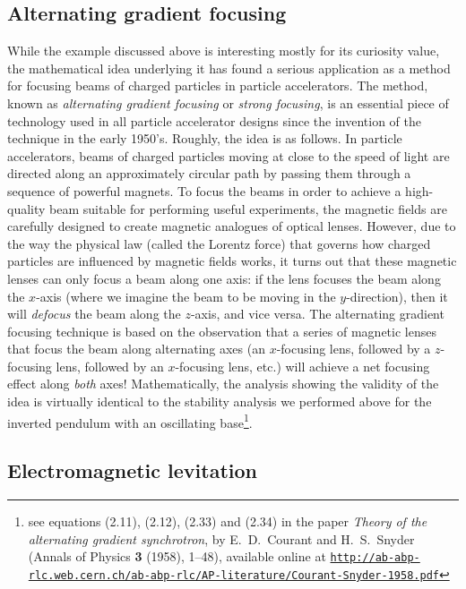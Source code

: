 \documentclass[12pt]{amsart}
\newcounter{example}
\begin{document}
\subsection{Alternating gradient focusing}

While the example discussed above is interesting mostly for its curiosity value, the mathematical idea underlying it has found a serious application as a method for focusing beams of charged particles in particle accelerators. The method, known as \emph{alternating gradient focusing} or \emph{strong focusing}, is an essential piece of technology used in all particle accelerator designs since the invention of the technique in the early 1950's. Roughly, the idea is as follows. In particle accelerators, beams of charged particles moving at close to the speed of light are directed along an approximately circular path by passing them through a sequence of powerful magnets. To focus the beams in order to achieve a high-quality beam suitable for performing useful experiments, the magnetic fields are carefully designed to create magnetic analogues of optical lenses. However, due to the way the physical law (called the Lorentz force) that governs how charged particles are influenced by magnetic fields works, it turns out that these magnetic lenses can only focus a beam along one axis: if the lens focuses the beam along the $x$-axis (where we imagine the beam to be moving in the $y$-direction), then it will \emph{defocus} the beam along the $z$-axis, and vice versa. The alternating gradient focusing technique is based on the observation that a series of magnetic lenses that focus the beam along alternating axes (an $x$-focusing lens, followed by a $z$-focusing lens, followed by an $x$-focusing lens, etc.) will achieve a net focusing effect along \emph{both} axes! Mathematically, the analysis showing the validity of the idea is virtually identical to the stability analysis we performed above for the inverted pendulum with an oscillating base\footnote{see equations (2.11), (2.12), (2.33) and (2.34) in the paper \emph{Theory of the alternating gradient synchrotron}, by E.~D.~Courant and H.~S.~Snyder (Annals of Physics \textbf{3} (1958), 1--48), available online at
\href{http://ab-abp-rlc.web.cern.ch/ab-abp-rlc/AP-literature/Courant-Snyder-1958.pdf}{\tiny \texttt{http://ab-abp-rlc.web.cern.ch/ab-abp-rlc/AP-literature/Courant-Snyder-1958.pdf}}}.

\subsection{Electromagnetic levitation} 
\end{document}
